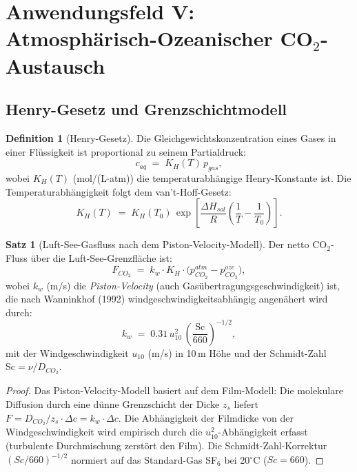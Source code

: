 ﻿\documentclass[a4paper,12pt]{article}
\theoremstyle{definition}
\newtheorem{definition}{Definition}
\newtheorem{satz}{Satz}
\begin{document}
\section{Anwendungsfeld V: Atmosphärisch-Ozeanischer CO$_2$-Austausch}

\subsection{Henry-Gesetz und Grenzschichtmodell}

\begin{definition}[Henry-Gesetz]
    Die Gleichgewichtskonzentration eines Gases in einer Flüssigkeit ist
    proportional zu seinem Partialdruck:
    \[
        c_{aq} \;=\; K_H(T)\,p_{gas},
    \]
    wobei $K_H(T)$ (mol/(L$\cdot$atm)) die temperaturabhängige Henry-Konstante ist.
    Die Temperaturabhängigkeit folgt dem van't-Hoff-Gesetz:
    \[
        K_H(T) \;=\; K_H(T_0)\,\exp\!\left[\frac{\Delta H_{sol}}{R}
        \left(\frac{1}{T} - \frac{1}{T_0}\right)\right].
    \]
\end{definition}

\begin{satz}[Luft-See-Gasfluss nach dem Piston-Velocity-Modell]
    Der netto CO$_2$-Fluss über die Luft-See-Grenzfläche ist:
    \[
        F_{CO_2} \;=\; k_w \cdot K_H \cdot \bigl(p_{CO_2}^{atm} - p_{CO_2}^{oze}\bigr),
    \]
    wobei $k_w$ (m/s) die \emph{Piston-Velocity} (auch Gasübertragungsgeschwindigkeit)
    ist, die nach Wanninkhof (1992) windgeschwindigkeitsabhängig angenähert wird durch:
    \[
        k_w \;=\; 0.31\,u_{10}^2\,\left(\frac{\mathrm{Sc}}{660}\right)^{-1/2},
    \]
    mit der Windgeschwindigkeit $u_{10}$ (m/s) in 10\,m Höhe und der Schmidt-Zahl
    $\mathrm{Sc} = \nu/D_{CO_2}$.
\end{satz}

\begin{proof}
    Das Piston-Velocity-Modell basiert auf dem Film-Modell:
    Die molekulare Diffusion durch eine dünne Grenzschicht der Dicke $z_s$
    liefert $F = D_{CO_2}/z_s \cdot \Delta c = k_w \cdot \Delta c$.
    Die Abhängigkeit der Filmdicke von der Windgeschwindigkeit wird empirisch
    durch die $u_{10}^2$-Abhängigkeit erfasst (turbulente Durchmischung
    zerstört den Film). Die Schmidt-Zahl-Korrektur $(Sc/660)^{-1/2}$ normiert
    auf das Standard-Gas SF$_6$ bei 20$^\circ$C ($Sc = 660$). \qedhere
\end{proof}
\end{document}
